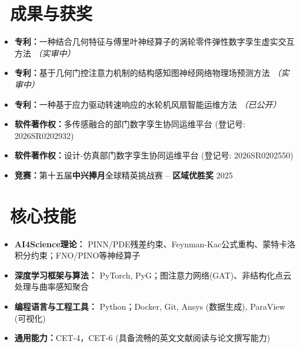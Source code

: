 \documentclass[11pt]{article}
\begin{document}
\section{%
    \makebox[\widthof{\faTrophy}][c]%
    {\color{CVBlue}\faTrophy}\ 成果与获奖%
}

\begin{itemize}
    \item \textbf{专利：}一种结合几何特征与傅里叶神经算子的涡轮零件弹性数字孪生虚实交互方法 \textit{（实审中）}
    \item \textbf{专利：}基于几何门控注意力机制的结构感知图神经网络物理场预测方法 \textit{（实审中）}
    \item \textbf{专利：}一种基于应力驱动转速响应的水轮机风扇智能运维方法 \textit{（已公开）}
    \item \textbf{软件著作权：}多传感融合的部门数字孪生协同运维平台 (登记号: 2026SR0202932)
    \item \textbf{软件著作权：}设计-仿真部门数字孪生协同运维平台 (登记号: 2026SR0202550)
    \item \textbf{竞赛：}第十五届\textbf{中兴捧月}全球精英挑战赛 -- \textbf{区域优胜奖} \hfill 2025
\end{itemize}

\section{\makebox[\widthof{\faCogs}][c]{\color{CVBlue}\faCogs}\ 核心技能}
    

\begin{itemize}
    \item \textbf{AI4Science理论：} PINN/PDE残差约束、Feynman-Kac公式重构、蒙特卡洛积分约束；FNO/PINO等神经算子
    \item \textbf{深度学习框架与算法：} PyTorch, PyG；图注意力网络(GAT)、非结构化点云处理与曲率感知聚合
    \item \textbf{编程语言与工程工具：} Python；Docker, Git, Ansys (数据生成), ParaView (可视化)
    \item \textbf{通用能力：}CET-4，CET-6 (具备流畅的英文文献阅读与论文撰写能力)
\end{itemize}
\end{document}
